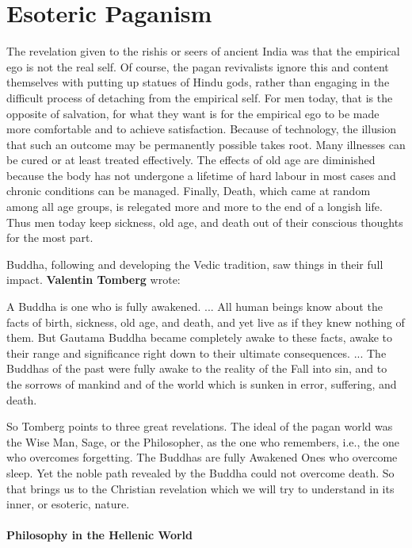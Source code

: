 \section{Esoteric Paganism}

The revelation given to the rishis or seers of ancient India was that the empirical ego is not the real self. Of course, the pagan revivalists ignore this and content themselves with putting up statues of Hindu gods, rather than engaging in the difficult process of detaching from the empirical self. For men today, that is the opposite of salvation, for what they want is for the empirical ego to be made more comfortable and to achieve satisfaction. Because of technology, the illusion that such an outcome may be permanently possible takes root. Many illnesses can be cured or at least treated effectively. The effects of old age are diminished because the body has not undergone a lifetime of hard labour in most cases and chronic conditions can be managed. Finally, Death, which came at random among all age groups, is relegated more and more to the end of a longish life. Thus men today keep sickness, old age, and death out of their conscious thoughts for the most part.

Buddha, following and developing the Vedic tradition, saw things in their full impact. \textbf{Valentin Tomberg} wrote:

\begin{quotex}
A Buddha is one who is fully awakened. ... All human beings know about the facts of birth, sickness, old age, and death, and yet live as if they knew nothing of them. But Gautama Buddha became completely awake to these facts, awake to their range and significance right down to their ultimate consequences. ... The Buddhas of the past were fully awake to the reality of the Fall into sin, and to the sorrows of mankind and of the world which is sunken in error, suffering, and death.
\end{quotex}


So Tomberg points to three great revelations. The ideal of the pagan world was the Wise Man, Sage, or the Philosopher, as the one who remembers, i.e., the one who overcomes forgetting. The Buddhas are fully Awakened Ones who overcome sleep. Yet the noble path revealed by the Buddha could not overcome death. So that brings us to the Christian revelation which we will try to understand in its inner, or esoteric, nature.

\paragraph{Philosophy in the Hellenic World}


